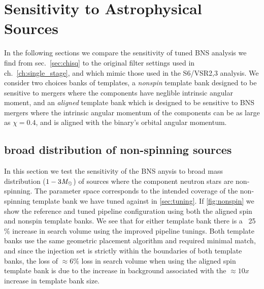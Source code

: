 
\section{Sensitivity to Astrophysical Sources}

In the following sections we compare the sensitivity of tuned BNS analysis we find from sec.~\ref{sec:chisq} to the original filter settings used in ch.~\ref{ch:single_stage}, and which mimic those used in the S6/VSR2,3 analysis. We consider two choices banks of templates, a \emph{nonspin} template bank designed to be sensitive to mergers where the components have neglible intrinsic angular moment, and an \emph{aligned} template bank which is designed to be sensitive to BNS mergers where the intrinsic angular momentum of the components can be as large as $\chi=0.4$, and is aligned with the binary's orbital angular momentum.

\subsection{broad distribution of non-spinning sources}

In this section we test the sensitivity of the BNS anysis to broad mass distribution ($1-3 \mathit{M}_\odot$) of sources where the component neutron stars are non-spinning. The parameter space corresponds to the intended coverage of the non-spinning template bank we have tuned against in \ref{sec:tuning}.  If \ref{fig:nonspin} we show the reference and tuned pipeline configuration using both the aligned spin and nonspin template banks. We see that for either template bank there is a ~25$\%$ increase in search volume using the improved pipeline tunings. Both template banks use the same geometric placement algorithm and required minimal match, and since the injection set is strictly within the boundaries of both template banks, the loss of $\approx 6\%$ loss in search volume when using the aligned spin template bank is due to the increase in background associated with the $\approx 10x$ increase in template bank size.

